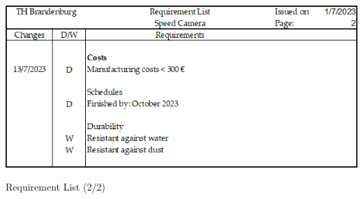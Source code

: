 \begin{table}[H]
    \centering
    \includegraphics[width= 0.9\linewidth]{texs/Part1/chapter2/image/req2.png}
    \caption{Requirement List (2/2)}
    \label{tab:req2}
\end{table}
